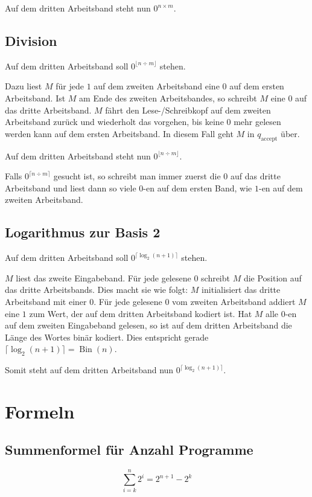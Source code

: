 Auf dem dritten Arbeitsband steht nun \(0^{n \times m}\).

\subsection{Division}
Auf dem dritten Arbeitsband soll \(0^{\lfloor n \div m \rfloor}\) stehen.

Dazu liest \(M\) für jede \(1\) auf dem zweiten Arbeitsband eine \(0\) auf dem ersten Arbeitsband. Ist \(M\) am Ende des zweiten Arbeitsbandes, so schreibt \(M\) eine \(0\) auf das dritte Arbeitsband. \(M\) fährt den Lese-/Schreibkopf auf dem zweiten Arbeitsband zurück und wiederholt das vorgehen, bis keine \(0\) mehr gelesen werden kann auf dem ersten Arbeitsband. In diesem Fall geht \(M\) in \(q_\text{accept}\) über.

Auf dem dritten Arbeitsband steht nun \(0^{\lfloor n \div m \rfloor}\).

Falls \(0^{\lceil n \div m \rceil}\) gesucht ist, so schreibt man immer zuerst die \(0\) auf das dritte Arbeitsband und liest dann so viele \(0\)-en auf dem ersten Band, wie \(1\)-en auf dem zweiten Arbeitsband.

\subsection{Logarithmus zur Basis 2}
Auf dem dritten Arbeitsband soll \(0^{\lceil \log_2(n+1) \rceil}\) stehen.

\(M\) liest das zweite Eingabeband. Für jede gelesene \(0\) schreibt \(M\) die Position auf das dritte Arbeitsbands. Dies macht sie wie folgt: \(M\) initialisiert das dritte Arbeitsband mit einer \(0\). Für jede gelesene \(0\) vom zweiten Arbeitsband addiert \(M\) eine \(1\) zum Wert, der auf dem dritten Arbeitsband kodiert ist. Hat \(M\) alle \(0\)-en auf dem zweiten Eingabeband gelesen, so ist auf dem dritten Arbeitsband die Länge des Wortes binär kodiert. Dies entspricht gerade \(\lceil \log_2(n+1) \rceil = \operatorname{Bin}(n)\).

Somit steht auf dem dritten Arbeitsband nun \(0^{\lceil \log_2(n+1) \rceil}\).

\section{Formeln}
\subsection{Summenformel für Anzahl Programme}
\[
\sum_{i = k}^n 2^i = 2^{n+1} - 2^k
\]
